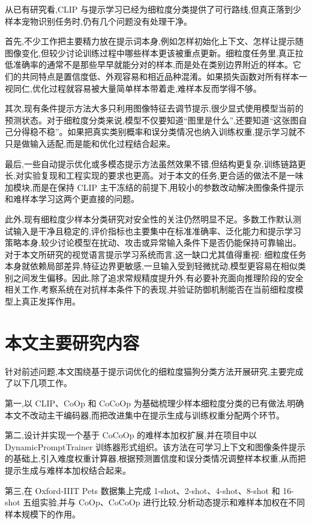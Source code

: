 从已有研究看,CLIP 与提示学习已经为细粒度分类提供了可行路线,但真正落到少样本宠物识别任务时,仍有几个问题没有处理干净。

首先,不少工作把主要精力放在提示词本身,例如怎样初始化上下文、怎样让提示随图像变化,但较少讨论训练过程中哪些样本更该被重点更新。细粒度任务里,真正拉低准确率的通常不是那些早早就能分对的样本,而是处在类别边界附近的样本。它们的共同特点是置信度低、外观容易和相近品种混淆。如果损失函数对所有样本一视同仁,优化过程就容易被大量简单样本带着走,难样本反而学得不够。

其次,现有条件提示方法大多只利用图像特征去调节提示,很少显式使用模型当前的预测状态。对于细粒度分类来说,模型不仅要知道“图里是什么”,还要知道“这张图自己分得稳不稳”。如果把真实类别概率和误分类情况也纳入训练权重,提示学习就不只是做输入适配,而是能和优化过程结合起来。

最后,一些自动提示优化或多模态提示方法虽然效果不错,但结构更复杂,训练链路更长,对实验复现和工程实现的要求也更高\cite{qu2025proapo,liu2025fgmpl,choi2025multimodal}。对于本文的任务,更合适的做法不是一味加模块,而是在保持 CLIP 主干冻结的前提下,用较小的参数改动解决图像条件提示和难样本学习这两个更直接的问题。

此外,现有细粒度少样本分类研究对安全性的关注仍然明显不足。多数工作默认测试输入是干净且稳定的,评价指标也主要集中在标准准确率、泛化能力和提示学习策略本身,较少讨论模型在扰动、攻击或异常输入条件下是否仍能保持可靠输出。对于本文所研究的视觉语言提示学习系统而言,这一缺口尤其值得重视: 细粒度任务本身就依赖局部差异,特征边界更敏感,一旦输入受到轻微扰动,模型更容易在相似类别之间发生偏移。因此,除了追求常规精度提升外,有必要补充面向推理阶段的安全相关工作,考察系统在对抗样本条件下的表现,并验证防御机制能否在当前细粒度模型上真正发挥作用。

\section{本文主要研究内容}

针对前述问题,本文围绕基于提示词优化的细粒度猫狗分类方法开展研究,主要完成了以下几项工作。

第一,以 CLIP、CoOp 和 CoCoOp 为基础梳理少样本细粒度分类的已有做法,明确本文不改动主干编码器,而把改进集中在提示生成与训练权重分配两个环节。

第二,设计并实现一个基于 CoCoOp 的难样本加权扩展,并在项目中以 DynamicPromptTrainer 训练器形式组织。该方法在可学习上下文和图像条件提示的基础上,引入难度权重计算器,根据预测置信度和误分类情况调整样本权重,从而把提示生成与难样本加权结合起来。

第三,在 Oxford-IIIT Pets 数据集上完成 1-shot、2-shot、4-shot、8-shot 和 16-shot 五组实验,并与 CoOp、CoCoOp 进行比较,分析动态提示和难样本加权在不同样本规模下的作用。

